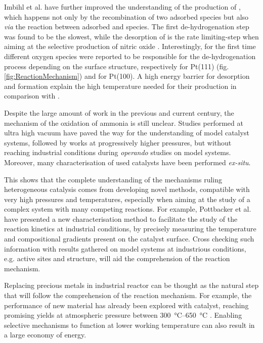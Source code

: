 Imbihl et al. \parencite*{Imbihl2007} have further improved the understanding of the production of , which happens not only by the recombination of two adsorbed  species but also \textit{via} the reaction between adsorbed  and  species.
The first de-hydrogenation step was found to be the slowest, while the desorption of  is the rate limiting-step when aiming at the selective production of nitric oxide \parencite{NovellLeruth2008}.
Interestingly, for the first time different oxygen species were reported to be responsible for the de-hydrogenation process depending on the surface structure, respectively  for Pt(111) (fig. \ref{fig:ReactionMechanism}) and  for Pt(100).
A high energy barrier for  desorption and  formation explain the high temperature needed for their production in comparison with .

Despite the large amount of work in the previous and current century, the mechanism of the oxidation of ammonia is still unclear.
Studies performed at ultra high vacuum have paved the way for the understanding of model catalyst systems, followed by works at progressively higher pressures, but without reaching industrial conditions during \textit{operando} studies on model systems.
Moreover, many characterisation of used catalysts have been performed \textit{ex-situ}.

This shows that the complete understanding of the mechanisms ruling heterogeneous catalysis comes from developing novel methods, compatible with very high pressures and temperatures, especially when aiming at the study of a complex system with many competing reactions.
For example, Pottbacker et al. \parencite*{Pottbacker2022} have presented a new characterisation method to facilitate the study of the reaction kinetics at industrial conditions, by precisely measuring the temperature and compositional gradients present on the catalyst surface.
Cross checking such information with results gathered on model systems at industrious conditions, e.g. active sites and structure, will aid the comprehension of the reaction mechanism.

Replacing precious metals in industrial reactor can be thought as the natural step that will follow the comprehension of the reaction mechanism.
For example, the performance of new material has already been explored with  catalyst, reaching promising  yields at atmospheric pressure between \qtyrange{300}{650}{\degreeCelsius} \parencite{Ruan2022}.
Enabling selective mechanisms to function at lower working temperature can also result in a large economy of energy.

